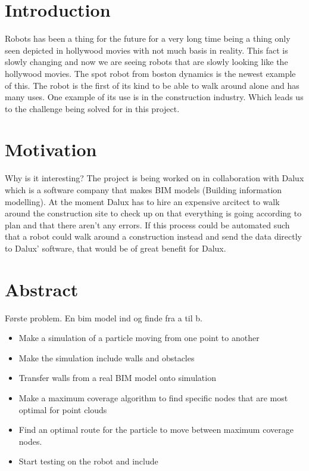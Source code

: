\section{Introduction}
Robots has been a thing for the future for a very long time being a thing only seen depicted in hollywood movies with not much basis in reality. This fact is slowly changing and now we are seeing robots that are slowly looking like the hollywood movies. The spot robot from boston dynamics is the newest example of this. The robot is the first of its kind to be able to walk around alone and has many uses. One example of its use is in the construction industry. 
Which leads us to the challenge being solved for in this project. 





\section*{Motivation}
Why is it interesting?
The project is being worked on in collaboration with Dalux which is a software company that makes BIM models (Building information modelling). At the moment Dalux has to hire an expensive arcitect to walk around the construction site to check up on that everything is going according to plan and that there aren’t any errors. If this process could be automated such that a robot could walk around a construction instead and send the data directly to Dalux’ software, that would be of great benefit for Dalux. 


\section{Abstract}
Første problem. En bim model ind og finde fra a til b.
\begin{itemize}
    \item Make a simulation of a particle moving from one point to another
    \item Make the simulation include walls and obstacles
    \item Transfer walls from a real BIM model onto simulation
    \item Make a maximum coverage algorithm to find specific nodes that are most optimal for point clouds
    \item Find an optimal route for the particle to move between maximum coverage nodes.
    \item Start testing on the robot and include 
\end{itemize}



